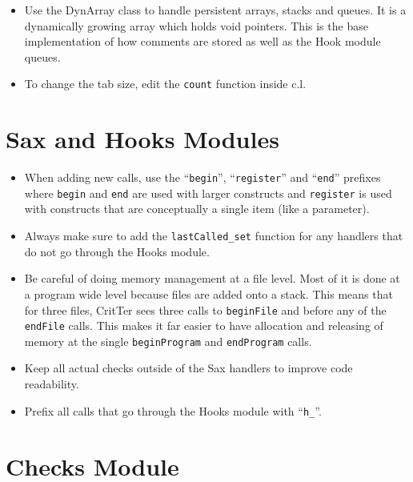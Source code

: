 \documentclass[12pt]{report}
\newcommand{\programName}{CritTer\xspace}
\begin{document}
\begin{itemize}
\item Use the DynArray class to handle persistent arrays, stacks and queues. It is a dynamically growing array which holds void pointers. This is the base implementation of how comments are stored as well as the Hook module queues.
\item To change the tab size, edit the \lstinline{count} function inside c.l.
\end{itemize}

\section{Sax and Hooks Modules}

\begin{itemize}
\item When adding new calls, use the ``\lstinline{begin}'', ``\lstinline{register}'' and ``\lstinline{end}'' prefixes where \lstinline{begin} and \lstinline{end} are used with larger constructs and \lstinline{register} is used with constructs that are conceptually a single item (like a parameter).
\item Always make sure to add the \lstinline{lastCalled_set} function for any handlers that do not go through the Hooks module.
\item Be careful of doing memory management at a file level. Most of it is done at a program wide level because files are added onto a stack. This means that for three files, \programName sees three calls to \lstinline{beginFile} and before any of the \lstinline{endFile} calls. This makes it far easier to have allocation and releasing of memory at the single \lstinline{beginProgram} and \lstinline{endProgram} calls.
\item Keep all actual checks outside of the Sax handlers to improve code readability.
\item Prefix all calls that go through the Hooks module with ``\lstinline{h_}''.
\end{itemize}

\section{Checks Module}
\end{document}

